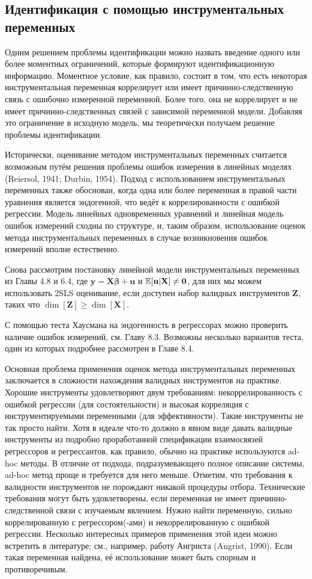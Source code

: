 \subsection{Идентификация с помощью инструментальных переменных} 
Одним решением проблемы идентификации можно назвать введение одного или более моментных ограничений, которые формируют идентификационную информацию. Моментное условие, как правило, состоит в том, что есть некоторая инструментальная переменная коррелирует или имеет причинно-следственную связь с ошибочно измеренной переменной. Более того, она не коррелирует и не имеет причинно-следственных связей с зависимой переменной модели. Добавляя это ограничение в исходную модель, мы теоретически получаем решение проблемы идентификации.

Исторически, оценивание методом инструментальных переменных считается возможным путём решения проблемы ошибок измерения в линейных моделях (Reiersol, 1941; Durbin, 1954). Подход с использованием инструментальных переменных также обоснован, когда одна или более переменная в правой части уравнения является эндогенной, что ведёт к коррелированности с ошибкой регрессии. Модель линейных одновременных уравнений и линейная модель ошибок измерений сходны по структуре, и, таким образом, использование оценок метода инструментальных переменных в случае возникновения ошибок измерений вполне естественно.

Снова рассмотрим постановку линейной модели инструментальных переменных из Главы 4.8 и 6.4, где $\mathbf{y=X\beta+u}$ и $\mathbb{E}[\mathbf{u|X}] \neq \mathbf{0}$, для них мы можем использовать 2SLS оценивание, если доступен набор валидных инструментов $\mathbf{Z}$, таких что $\dim[\mathbf{Z}] \geqslant \dim[\mathbf{X}]$.

С помощью теста Хаусмана на эндогенность в регрессорах можно проверить наличие ошибок измерений, см. Главу 8.3. Возможны несколько вариантов теста, один из которых подробнее рассмотрен в Главе 8.4.

Основная проблема применения оценок метода инструментальных переменных заключается в сложности нахождения валидных инструментов на практике. Хорошие инструменты удовлетворяют двум требованиям: некоррелированность с ошибкой регрессии (для состоятельности) и высокая корреляция с инструментируемыми переменными (для эффективности). Такие инструменты не так просто найти. Хотя в идеале что-то должно в явном виде давать валидные инструменты из подробно проработанной спецификации взаимосвязей регрессоров и регрессантов, как правило, обычно на практике используются ad-hoc методы. В отличие от подхода, подразумевающего полное описание системы, ad-hoc метод проще и требуется для него меньше. Отметим, что требования к валидности инструментов не порождают никакой процедуры отбора. Технические требования могут быть удовлетворены, если переменная не имеет причинно-следственной связи с изучаемым явлением. Нужно найти переменную, сильно коррелированную с регрессором(-ами) и некоррелированную с ошибкой регрессии. Несколько интересных примеров применения этой идеи можно встретить в литературе; см., например, работу Ангриста (Angrist, 1990). Если такая переменная найдена, её использование может быть спорным и противоречивым.

